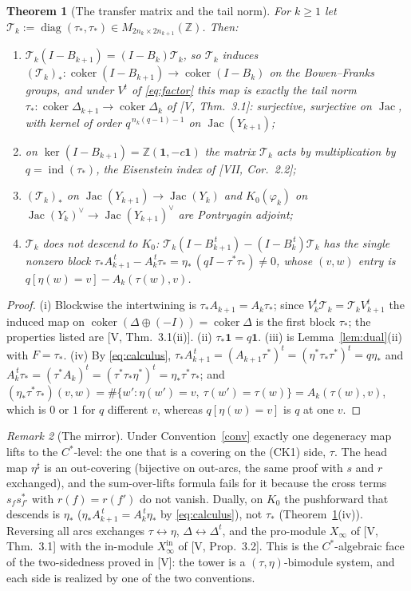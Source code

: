 \documentclass[11pt]{amsart}
\numberwithin{equation}{section}
\newtheorem{theorem}{Theorem}[section]
\theoremstyle{definition}
\theoremstyle{remark}
\newtheorem{remark}[theorem]{Remark}
\newcommand{\Z}{\mathbb{Z}}
\newcommand{\cT}{\mathcal{T}}
\newcommand{\Jac}{\operatorname{Jac}}
\newcommand{\coker}{\operatorname{coker}}
\newcommand{\ind}{\operatorname{ind}}
\newcommand{\ta}{\tau_*}
\newcommand{\taup}{\tau^*}
\newcommand{\et}{\eta_*}
\newcommand{\etp}{\eta^*}
\newcommand{\shadow}[1]{{#1}^{\sharp}}
\newcommand{\Tdn}{\cT_{k}}
\begin{document}
\begin{theorem}[The transfer matrix and the tail norm]\label{thm:matrix}
For $k\ge1$ let $\Tdn:=\operatorname{diag}(\ta,\ta)\in M_{2n_k\times2n_{k+1}}(\Z)$. Then:
\begin{enumerate}
\item[(i)] $\Tdn(I-B_{k+1})=(I-B_k)\Tdn$, so $\Tdn$ induces
$(\Tdn)_*\colon\coker(I-B_{k+1})\to\coker(I-B_k)$ on the Bowen--Franks groups, and
under $V^{t}$ of \eqref{eq:factor} this map is exactly the tail norm
$\ta\colon\coker\Delta_{k+1}\to\coker\Delta_k$ of {\rm[V, Thm.~3.1]}: surjective,
surjective on $\Jac$, with kernel of order $q^{\,n_k(q-1)-1}$ on $\Jac(Y_{k+1})$;
\item[(ii)] on $\ker(I-B_{k+1})=\Z(\mathbf1,-c\mathbf1)$ the matrix $\Tdn$ acts by
multiplication by $q=\ind(\ta)$, the Eisenstein index of {\rm[VII, Cor.~2.2]};
\item[(iii)] $(\Tdn)_*$ on $\Jac(Y_{k+1})\to\Jac(Y_k)$ and $K_0(\varphi_k)$ on
$\Jac(Y_k)^{\vee}\to\Jac(Y_{k+1})^{\vee}$ are Pontryagin adjoint;
\item[(iv)] $\Tdn$ does \emph{not} descend to $K_0$: $\Tdn(I-B_{k+1}^{\,t})-(I-B_k^{\,t})\Tdn$
has the single nonzero block $\ta A_{k+1}^{\,t}-A_k^{\,t}\ta=\et\,(qI-\taup\ta)\ne0$,
whose $(v,w)$ entry is $q[\eta(w)=v]-A_k(\tau(w),v)$.
\end{enumerate}
\end{theorem}

\begin{proof}
(i) Blockwise the intertwining is $\ta A_{k+1}=A_k\ta$; since $V_k^{t}\Tdn=\Tdn V_{k+1}^{t}$
the induced map on $\coker(\Delta\oplus(-I))=\coker\Delta$ is the first block $\ta$;
the properties listed are [V, Thm.~3.1(ii)]. (ii) $\ta\mathbf1=q\mathbf1$. (iii) is
Lemma~\ref{lem:dual}(ii) with $F=\ta$. (iv) By \eqref{eq:calculus},
$\ta A_{k+1}^{\,t}=(A_{k+1}\taup)^{t}=(\etp\ta\taup)^{t}=q\et$ and
$A_k^{\,t}\ta=(\taup A_k)^{t}=(\taup\ta\etp)^{t}=\et\taup\ta$; and
$(\et\taup\ta)(v,w)=\#\{w':\eta(w')=v,\ \tau(w')=\tau(w)\}=A_k(\tau(w),v)$, which is
$0$ or $1$ for $q$ different $v$, whereas $q[\eta(w)=v]$ is $q$ at one $v$.
\end{proof}

\begin{remark}[The mirror]\label{rem:mirror}
Under Convention~\ref{conv} exactly one degeneracy map lifts to the $C^*$-level: the one
that is a covering on the (CK1) side, $\tau$. The head map $\shadow\eta$ is an
out-covering (bijective on out-arcs, the same proof with $s$ and $r$ exchanged), and the
sum-over-lifts formula fails for it because the cross terms $s_fs_{f'}^*$ with $r(f)=r(f')$
do not vanish. Dually, on $K_0$ the pushforward that descends is $\et$
($\et A_{k+1}^{\,t}=A_k^{\,t}\et$ by \eqref{eq:calculus}), not $\ta$
(Theorem~\ref{thm:matrix}(iv)). Reversing all arcs exchanges $\tau\leftrightarrow\eta$,
$\Delta\leftrightarrow\Delta^{t}$, and the pro-module $X_\infty$ of [V, Thm.~3.1] with
the in-module $X_\infty^{\mathrm{in}}$ of [V, Prop.~3.2]. This is the $C^*$-algebraic
face of the two-sidedness proved in [V]: the tower is a $(\tau,\eta)$-bimodule system,
and each side is realized by one of the two conventions.
\end{remark}
\end{document}
